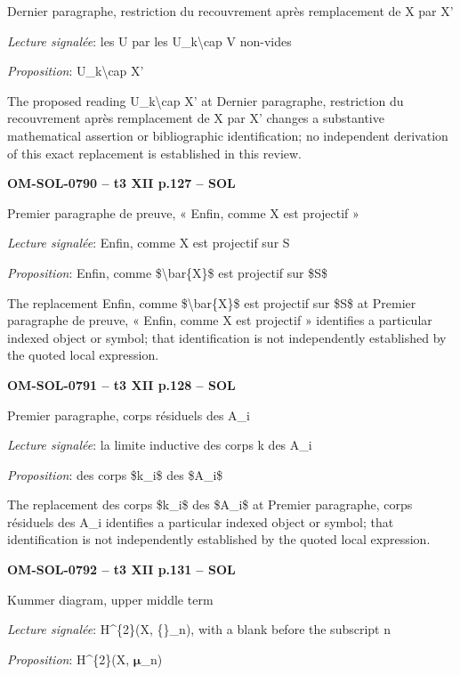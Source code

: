 Dernier paragraphe, restriction du recouvrement après remplacement de X par X'\par
\emph{Lecture signalée}: les U par les U\_k\textbackslash{}cap V non-vides\par
\emph{Proposition}: U\_k\textbackslash{}cap X'\par
The proposed reading U\_k\textbackslash{}cap X' at Dernier paragraphe, restriction du recouvrement après remplacement de X par X' changes a substantive mathematical assertion or bibliographic identification; no independent derivation of this exact replacement is established in this review.\par
\par\noindent\textbf{OM-SOL-0790 -- t3 XII p.127 -- SOL}\par
Premier paragraphe de preuve, « Enfin, comme X est projectif »\par
\emph{Lecture signalée}: Enfin, comme X est projectif sur S\par
\emph{Proposition}: Enfin, comme \$\textbackslash{}bar\{X\}\$ est projectif sur \$S\$\par
The replacement Enfin, comme \$\textbackslash{}bar\{X\}\$ est projectif sur \$S\$ at Premier paragraphe de preuve, « Enfin, comme X est projectif » identifies a particular indexed object or symbol; that identification is not independently established by the quoted local expression.\par
\par\noindent\textbf{OM-SOL-0791 -- t3 XII p.128 -- SOL}\par
Premier paragraphe, corps résiduels des A\_i\par
\emph{Lecture signalée}: la limite inductive des corps k des A\_i\par
\emph{Proposition}: des corps \$k\_i\$ des \$A\_i\$\par
The replacement des corps \$k\_i\$ des \$A\_i\$ at Premier paragraphe, corps résiduels des A\_i identifies a particular indexed object or symbol; that identification is not independently established by the quoted local expression.\par
\par\noindent\textbf{OM-SOL-0792 -- t3 XII p.131 -- SOL}\par
Kummer diagram, upper middle term\par
\emph{Lecture signalée}: H\textasciicircum{}\{2\}(X, \{\}\_n), with a blank before the subscript n\par
\emph{Proposition}: H\textasciicircum{}\{2\}(X, \ensuremath{𝛍}\_n)\par
